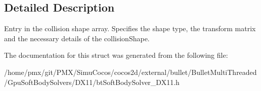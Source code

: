 \subsection{Detailed Description}
Entry in the collision shape array. Specifies the shape type, the transform matrix and the necessary details of the collision\+Shape. 

The documentation for this struct was generated from the following file\+:\begin{DoxyCompactItemize}
\item 
/home/pmx/git/\+P\+M\+X/\+Simu\+Cocos/cocos2d/external/bullet/\+Bullet\+Multi\+Threaded/\+Gpu\+Soft\+Body\+Solvers/\+D\+X11/bt\+Soft\+Body\+Solver\+\_\+\+D\+X11.\+h\end{DoxyCompactItemize}
